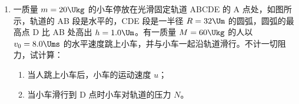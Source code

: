 \documentclass[\gkver]{gaokaozhenti}
\begin{document}
\begin{enumerate}
{（2）解：设管内外水银面的高度差为 $h\Ucm$，由（1）可知，是管外水银面高于管内，又设管的截面积为 $S\Ucmq$，则：

管内空气的初状态：压强 $p_{1}=75\UcmHg$，体积 $V_{1}=27S\Ucmc$

管内空气的末状态：压强 $p_{2}=(75+h)\UcmHg$，体积 $V_{2}=(27-8+h)S\Ucmc$

由玻意耳$-$马略特定律 $p_{1}V_{1}=p_{2}V_{2}$（1 分）

代入得：$75\times27S=(75+h)(27-8+h)S$（3 分）

$h^{2}+94h-600=0$

$(h+100)(h-6)=0$

$h=6\Ucm$（1 分）

$h=-100\Ucm$（不合题意舍去）
}

\item
一质量 $m=20\Ukg$ 的小车停放在光滑固定轨道 ABCDE 的 A 点处，如图所示，轨道的 AB 段是水平的，CDE 段是一半径 $R=32\Um$ 的圆弧，圆弧的最高点 D 比 AB 处高出 $h=1.0\Um$。有一质量 $M=60\Ukg$ 的人以 $v_{0}=8.0\Ums$ 的水平速度跳上小车，并与小车一起沿轨道滑行。不计一切阻力，试计算：
\begin{enumerate}
	\item
	当人跳上小车后，小车的运动速度 $u$；
	\item
	当小车滑行到 D 点时小车对轨道的压力 $N$。
\end{enumerate}
\onepicture[align=right, w=12.41cm]{}


\end{enumerate}
\end{document}

